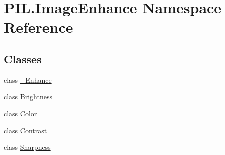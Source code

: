 \hypertarget{namespacePIL_1_1ImageEnhance}{}\section{P\+I\+L.\+Image\+Enhance Namespace Reference}
\label{namespacePIL_1_1ImageEnhance}
\subsection*{Classes}
\begin{DoxyCompactItemize}
\item 
class \hyperlink{classPIL_1_1ImageEnhance_1_1__Enhance}{\+\_\+\+Enhance}
\item 
class \hyperlink{classPIL_1_1ImageEnhance_1_1Brightness}{Brightness}
\item 
class \hyperlink{classPIL_1_1ImageEnhance_1_1Color}{Color}
\item 
class \hyperlink{classPIL_1_1ImageEnhance_1_1Contrast}{Contrast}
\item 
class \hyperlink{classPIL_1_1ImageEnhance_1_1Sharpness}{Sharpness}
\end{DoxyCompactItemize}
